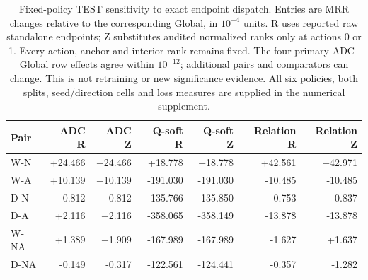 \begin{table}[htbp]
\centering\footnotesize\setlength{\tabcolsep}{4pt}
\caption{Fixed-policy TEST sensitivity to exact endpoint dispatch. Entries are MRR changes relative to the corresponding Global, in $10^{-4}$ units. R uses reported raw standalone endpoints; Z substitutes audited normalized ranks only at actions 0 or 1. Every action, anchor and interior rank remains fixed. The four primary ADC--Global row effects agree within $10^{-12}$; additional pairs and comparators can change. This is not retraining or new significance evidence. All six policies, both splits, seed/direction cells and loss measures are supplied in the numerical supplement.}
\label{tab:endpoint-policies}
\begin{tabular}{lrrrrrr}
\toprule
Pair & ADC R & ADC Z & Q-soft R & Q-soft Z & Relation R & Relation Z\\
\midrule
W-N & +24.466 & +24.466 & +18.778 & +18.778 & +42.561 & +42.971\\
W-A & +10.139 & +10.139 & -191.030 & -191.030 & -10.485 & -10.485\\
D-N & -0.812 & -0.812 & -135.766 & -135.850 & -0.753 & -0.837\\
D-A & +2.116 & +2.116 & -358.065 & -358.149 & -13.878 & -13.878\\
W-NA & +1.389 & +1.909 & -167.989 & -167.989 & -1.627 & +1.637\\
D-NA & -0.149 & -0.317 & -122.561 & -124.441 & -0.357 & -1.282\\
\bottomrule
\end{tabular}
\end{table}
